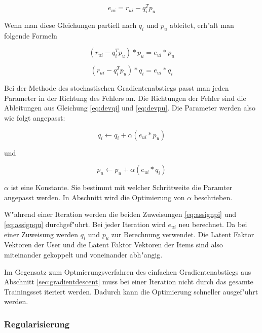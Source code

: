 \documentclass[a4paper, 12pt]{article}
\begin{document}
\begin{equation}
  \label{eq:error1}
  e_{ui} = r_{ui} - q_i^T p_u
\end{equation}

Wenn man diese Gleichungen partiell nach $q_i$ und $p_u$ ableitet, erh"alt man folgende Formeln

\begin{equation}
  \label{eq:devqi}
  (r_{ui} - q_i^T p_u) * p_u =  e_{ui} * p_u
\end{equation}

\begin{equation}
  \label{eq:devpu}
    (r_{ui} - q_i^T p_u) * q_i =  e_{ui} * q_i
\end{equation}

Bei der Methode des stochastischen Gradientenabstiegs passt man jeden Parameter in der Richtung des Fehlers an. Die Richtungen der Fehler sind die Ableitungen aus Gleichung \ref{eq:devqi} und \ref{eq:devpu}. Die Parameter werden also wie folgt angepasst:

\begin{equation}
  \label{eq:assignpi}
 q_i \leftarrow q_i + \alpha (e_{ui} * p_u)
\end{equation}

und

\begin{equation}
  \label{eq:assignqu}
 p_u \leftarrow p_u + \alpha (e_{ui} * q_i)
\end{equation}

$\alpha$ ist eine Konstante. Sie bestimmt mit welcher Schrittweite die Paramter angepasst werden. In Abschnitt \label{sec:results} wird die Optimierung von $\alpha$ beschrieben.

W"ahrend einer Iteration werden die beiden Zuweisungen \ref{eq:assignpi} und \ref{eq:assignqu} durchgef"uhrt. Bei jeder Iteration wird $e_{ui}$ neu berechnet. Da bei einer Zuweisung werden $q_i$ und $p_u$ zur Berechnung verwendet. Die Latent Faktor Vektoren der User und die Latent Faktor Vektoren der Items sind also miteinander gekoppelt und voneinander abh"angig.

Im Gegensatz zum Optmierungsverfahren des einfachen Gradientenabstiegs aus Abschnitt \ref{sec:gradientdescent} muss bei einer Iteration nicht durch das gesamte Trainingsset iteriert werden. Dadurch kann die Optimierung schneller ausgef"uhrt werden.

\subsubsection{Regularisierung}
\label{sec:regularization2}
\end{document}

